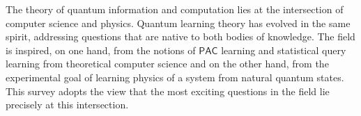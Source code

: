 \documentclass[11pt]{article}
\newcommand{\PAC}{\ensuremath{\mathsf{PAC}}}
\begin{document}


The theory of quantum information and computation lies at the intersection of computer science and physics. Quantum learning theory has evolved in the same spirit, addressing questions that are native to both bodies of knowledge. The field is inspired, on one hand, from the notions of $\PAC$ learning and statistical query learning from theoretical computer science and on the other hand, from the experimental goal of learning physics of a system from natural quantum states. This survey adopts the view that the most exciting questions in the field lie precisely at this intersection.
\end{document}
